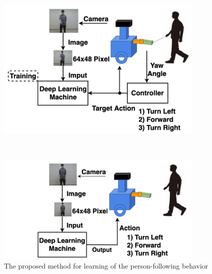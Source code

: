   \begin{figure}[h]
    \centering
    \begin{minipage}[c]{100mm} 
        \centering
        \includegraphics[width=100mm]{images/okada_learning_phase_system.png}
    \end{minipage} \\
    \vspace{1em} %
    \begin{minipage}[c]{100mm} 
        \centering
        \includegraphics[width=100mm]{images/okada_following_phase_system.png}
    \end{minipage}
    \caption{The proposed method for learning of the person-following behavior\cite{okada}}
    \label{Fig:okada_system}
  \end{figure}

\newpage

